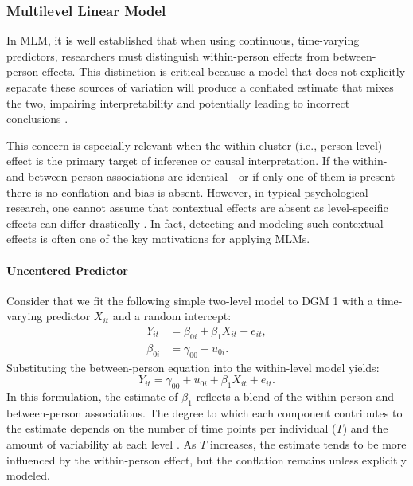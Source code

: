 \subsubsection{Multilevel Linear Model}

In MLM, it is well established that when using continuous, time-varying predictors, researchers must distinguish within-person effects from between-person effects. This distinction is critical because a model that does not explicitly separate these sources of variation will produce a conflated estimate that mixes the two, impairing interpretability and potentially leading to incorrect conclusions \parencite[e.g.,][]{enders_centering_2007, kreft_effect_1995, raudenbush_hierarchical_2002}.

This concern is especially relevant when the within-cluster (i.e., person-level) effect is the primary target of inference or causal interpretation. If the within- and between-person associations are identical—or if only one of them is present—there is no conflation and bias is absent. However, in typical psychological research, one cannot assume that contextual effects are absent as level-specific effects can differ drastically \parencite[]{curran_disaggregation_2011, robinson_ecological_1950}. In fact, detecting and modeling such contextual effects is often one of the key motivations for applying MLMs.

\paragraph{Uncentered Predictor}

Consider that we fit the following simple two-level model to DGM 1 with a time-varying predictor \( X_{it} \) and a random intercept:
\begin{align}
\label{eqn:method-M1-linear-within}
Y_{it} &= \beta_{0i} + \beta_1 X_{it} + e_{it}, \\
\label{eqn:method-M1-linear-between}
\beta_{0i} &= \gamma_{00} + u_{0i}.
\end{align}
Substituting the between-person equation into the within-level model yields:
\begin{equation}
\label{eqn:method-M1-linear}
Y_{it} = \gamma_{00} + u_{0i} + \beta_1 X_{it} + e_{it}.
\end{equation}
In this formulation, the estimate of \( \beta_1 \) reflects a blend of the within-person and between-person associations. The degree to which each component contributes to the estimate depends on the number of time points per individual (\( T \)) and the amount of variability at each level \parencite{mundlak_pooling_1978}. As \( T \) increases, the estimate tends to be more influenced by the within-person effect, but the conflation remains unless explicitly modeled.

